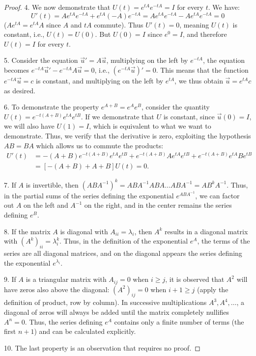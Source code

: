 \begin{theorem}
\begin{proof}
4. We now demonstrate that $U(t) = e^{tA}e^{-tA}=I$ for every $t$. We have:
\[
 U'(t) = A e^{tA}e^{-tA} + e^{tA}(-A)e^{-tA}
       = A e^{tA}e^{-tA} - A e^{tA}e^{-tA} = 0
\]
($Ae^{tA} = e^{tA}A$ since $A$ and $tA$ commute).
Thus $U'(t)=0$, meaning $U(t)$ is constant, i.e., $U(t)=U(0)$. But $U(0)=I$
since $e^0=I$, and therefore $U(t)=I$ for every $t$.

5. Consider the equation $\vec u' = A\vec u$, multiplying on the left by
$e^{-tA}$, the equation becomes $e^{-tA} \vec u' - e^{-tA} A \vec u=0$, i.e.,
$(e^{-tA} \vec u)' = 0$. This means that the function $e^{-tA}\vec u = c$ is
constant, and multiplying on the left by $e^{tA}$, we thus obtain $\vec u =
e^{tA}c$ as desired.

6. To demonstrate the property $e^{A+B}=e^A e^B$, consider the quantity $U(t) =
e^{-t(A+B)} e^{tA} e^{tB}$. If we demonstrate that $U$ is constant, since $\vec
u(0)=I$, we will also have $U(1)=I$, which is equivalent to what we want to
demonstrate. Thus, we verify that the derivative is zero, exploiting the
hypothesis $AB=BA$ which allows us to commute the products:
\begin{align*}
U'(t) & = -(A+B)e^{-t(A+B)} e^{tA} e^{tB} + e^{-t(A+B)}Ae^{tA}e^{tB} +
e^{-t(A+B)}e^{tA} B e^{tB} \\
& = [-(A+B) + A + B] U(t) = 0.
\end{align*}

7. If $A$ is invertible, then $(ABA^{-1})^k = ABA^{-1}ABA\dots ABA^{-1} = AB^k
A^{-1}$. Thus, in the partial sums of the series defining the exponential
$e^{ABA^{-1}}$, we can factor out $A$ on the left and $A^{-1}$ on the right, and
in the center remains the series defining $e^B$.

8. If the matrix $A$ is diagonal with $A_{ii}=\lambda_i$, then $A^k$ results in
a diagonal matrix with $(A^k)_{ii} = \lambda_i^k$. Thus, in the definition of
the exponential $e^A$, the terms of the series are all diagonal matrices, and on
the diagonal appears the series defining the exponential $e^{\lambda_i}$.

9. If $A$ is a triangular matrix with $A_{ij}=0$ when $i\ge j$, it is observed
that $A^2$ will have zeros also above the diagonal: $(A^2)_{ij}=0$ when $i+1\ge
j$ (apply the definition of product, row by column). In successive
multiplications $A^3, A^4,\dots$, a diagonal of zeros will always be added until
the matrix completely nullifies $A^n=0$. Thus, the series defining $e^A$
contains only a finite number of terms (the first $n+1$) and can be calculated
explicitly.

10. The last property is an observation that requires no proof.
\end{proof}
\end{theorem}